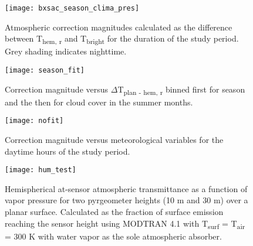 \begin{figure}[H]
	\centering
	\texttt{[image: bxsac\_season\_clima\_pres]}
	\caption{Atmospheric correction magnitudes calculated as the difference between T\textsubscript{hem, r} and T\textsubscript{bright} for the duration of the study period. Grey shading indicates nighttime.}
	\label{bx_ac}
\end{figure}

\begin{figure}[H]
	\centering
	\texttt{[image: season\_fit]}
	\caption{Correction magnitude versus $\Delta$T\textsubscript{plan - hem, r} binned first for season and the then for cloud cover in the summer months.}
	\label{season_fit}
\end{figure}

\begin{figure}[H]
	\centering
	\texttt{[image: nofit]}
	\caption{Correction magnitude versus meteorological variables for the daytime hours of the study period. }
	\label{nofit}
\end{figure}

\begin{figure}[H]
	\centering
	\texttt{[image: hum\_test]}
	\caption{Hemispherical at-sensor atmospheric transmittance as a function of vapor pressure for two pyrgeometer heights (10 \si{\meter} and 30 \si{\meter}) over a planar surface. Calculated as the fraction of surface emission reaching the sensor height using MODTRAN 4.1 with T\textsubscript{surf} = T\textsubscript{air} = 300 \si{\kelvin} with water vapor as the sole atmospheric absorber.}
	\label{humtest}
\end{figure}


